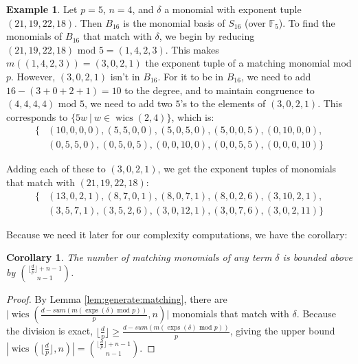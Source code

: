 \documentclass[a4paper]{article}
\newtheorem{cor}[thm]{Corollary}
\theoremstyle{definition}
\newtheorem{ex}[thm]{Example}
\theoremstyle{remark}
\newcommand{\exps}{\operatorname{exps}}
\newcommand{\wics}{\operatorname{wics}}
\newcommand{\mathmod}{ \text{ mod }}
\begin{document}
\begin{ex}
    Let $p = 5$, \(n = 4\), and $\delta$ a monomial 
    with exponent tuple $(21, 19, 22, 18)$. 
    Then $B_{16}$ is the monomial basis of 
    \(S_{16}\) (over $\mathbb{F}_5$). 
    To find the monomials of $B_{16}$ that match with 
    $\delta$, we begin by reducing $(21, 19, 22, 18) \mathmod 5 = (1, 4, 2, 3)$.
    This makes $m((1, 4, 2, 3)) = (3, 0, 2, 1)$ the 
    exponent tuple of a matching monomial mod \(p\).
    However, \((3, 0, 2, 1)\) isn't in $B_{16}$. 
    For it to be in $B_{16}$, we need to add $16 - (3 + 0 + 2 + 1) = 10$ 
    to the degree, and to maintain congruence to 
    $(4, 4, 4, 4) \mathmod 5$, we need to add two $5$'s 
    to the elements of $(3, 0, 2, 1)$. This corresponds 
    to $\{5w ~|~ w \in \wics(2, 4)\}$, which is:
    \begin{align*}
        \{&(10, 0, 0, 0), (5, 5, 0, 0), (5, 0, 5, 0), (5, 0, 0, 5), (0, 10, 0, 0), \\
        &(0, 5, 5, 0), (0, 5, 0, 5), (0, 0, 10, 0), (0, 0, 5, 5), (0, 0, 0, 10)\}
    \end{align*}
        
    \noindent Adding each of these to $(3, 0, 2, 1)$, we get the 
    exponent tuples of monomials that match with $(21, 19, 22, 18)$:
    \begin{align*}
        \{&(13, 0, 2, 1), (8, 7, 0, 1), (8, 0, 7, 1), (8, 0, 2, 6), (3, 10, 2, 1), \\
        &(3, 5, 7, 1), (3, 5, 2, 6), (3, 0, 12, 1), (3, 0, 7, 6), (3, 0, 2, 11)\}
    \end{align*}    
\end{ex}

Because we need it later for our complexity computations, we have the corollary:

\begin{cor}
    \label{cor:num:matches}
    The number of matching monomials of any term $\delta$ is 
    bounded above by $\binom{\lfloor \frac{d}{p} \rfloor + n - 1}{n - 1}$.
\end{cor}

\begin{proof}
    By Lemma \ref{lem:generate:matching}, there are 
    $\Big |\wics \left(\frac{d - sum(m(\exps(\delta) \mathmod p))}{p}, n \right) \Big |$ 
    monomials that match with $\delta$.
    Because the division is exact, 
    $\lfloor \frac{d}{p} \rfloor \geq \frac{d - sum(m(\exps(\delta) \mathmod p))}{p}$,
    giving the upper bound 
    $|\wics(\lfloor \frac{d}{p} \rfloor, n)| = \binom{\lfloor \frac{d}{p} \rfloor + n - 1}{n - 1}$.
\end{proof}
\end{document}
